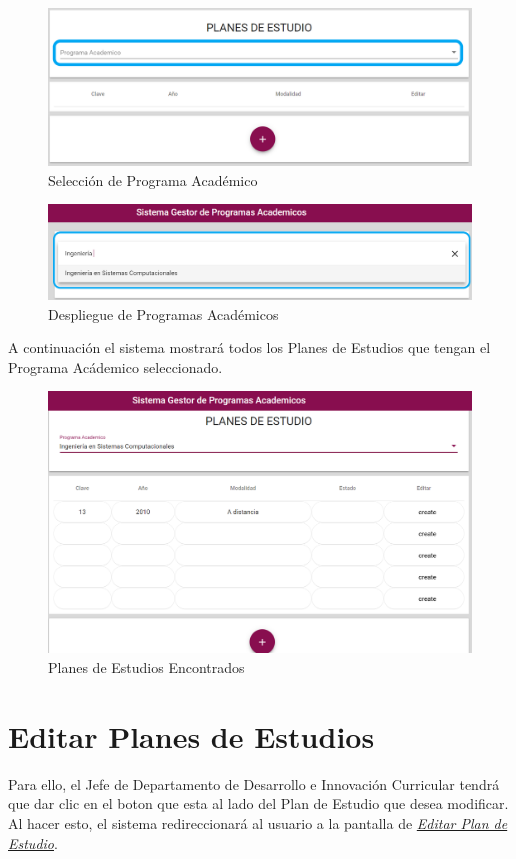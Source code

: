 \begin{figure}[!hbtp]
	\centering
	\hypertarget{academico}{\includegraphics[width=0.7\linewidth]{images/SP4-GPE/programa}}
	\caption{Selección de Programa Académico}
	\label{academico}
\end{figure}

\begin{figure}[!hbtp]
	\centering
	\hypertarget{academico2}{\includegraphics[width=0.7\linewidth]{images/SP4-GPE/programaD}}
	\caption{Despliegue de Programas Académicos}
	\label{academico2}
\end{figure}

A continuación el sistema mostrará todos los Planes de Estudios que tengan el Programa Acádemico seleccionado.
\begin{figure}[!hbtp]
	\centering
	\hypertarget{planes}{\includegraphics[width=0.7\linewidth]{images/SP4-GPE/consultar}}
	\caption{Planes de Estudios Encontrados}
	\label{planes}
\end{figure}
\newpage
\section{Editar Planes de Estudios}

Para ello, el Jefe de Departamento de Desarrollo e Innovación Curricular tendrá que dar clic en el boton  que esta al lado del Plan de Estudio que desea modificar. Al hacer esto, el sistema redireccionará al usuario a la pantalla de \hyperlink{editarPE}{\textit{Editar Plan de Estudio}}.

